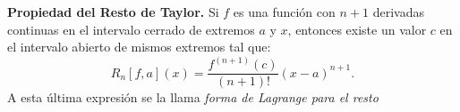 \begin{propertie} \label{def:RestoTaylor} {\textbf{Propiedad del Resto de Taylor.}}  Si $f$ es una función con $n+1$ derivadas continuas en el intervalo cerrado de extremos $a$ y $x$, entonces existe un valor $c$ en el intervalo abierto de mismos extremos tal que:
\begin{equation*} 
R_n[f,a](x) = \frac{f^{(n+1)}(c)}{(n+1)!} (x-a)^{n+1}. 
\end{equation*}
A esta última expresión se la llama \textit{forma de Lagrange para el resto}
   
\end{propertie}